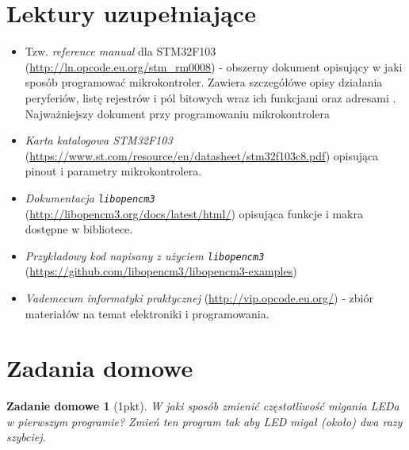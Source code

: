\documentclass{pdfBooklets}
\begin{document}
\section{Lektury uzupełniające}
\begin{itemize}

\item Tzw. \emph{reference manual} dla STM32F103 (\url{http://ln.opcode.eu.org/stm_rm0008}) - obszerny dokument opisujący w jaki sposób programować
  mikrokontroler. Zawiera szczegółówe opisy działania peryferiów, listę rejestrów i pól bitowych wraz ich funkcjami oraz
  adresami \footnotemark. Najważniejszy dokument przy programowaniu mikrokontrolera
  

\item \emph{Karta katalogowa STM32F103}\\ (\url{https://www.st.com/resource/en/datasheet/stm32f103c8.pdf}) opisująca pinout i
  parametry mikrokontrolera.

\item \emph{Dokumentacja \Verb$libopencm3$}\\ (\url{http://libopencm3.org/docs/latest/html/}) opisująca funkcje i makra dostępne
  w bibliotece.
  
\item \emph{Przykładowy kod napisany z użyciem \Verb$libopencm3$} (\url{https://github.com/libopencm3/libopencm3-examples}) 
  
\item \emph{Vademecum informatyki praktycznej} (\url{http://vip.opcode.eu.org/}) - zbiór materiałów na temat elektroniki i programowania.

\end{itemize}




\clearpage
\section{Zadania domowe}
\newtheorem{ZadanieDomowe}{Zadanie domowe}

\begin{ZadanieDomowe} [1pkt]
W jaki sposób zmienić częstotliwość migania LEDa w pierwszym programie? Zmień ten program tak aby LED migał (około) dwa razy szybciej.
\end{ZadanieDomowe}
\end{document}
